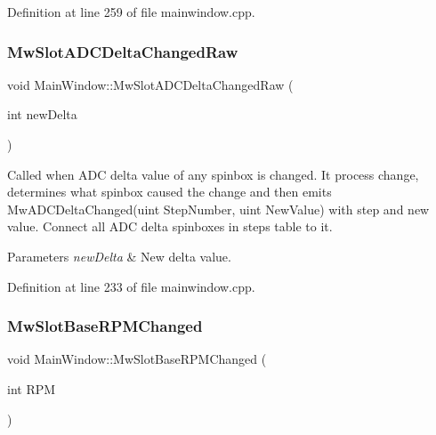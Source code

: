 Definition at line 259 of file mainwindow.\+cpp.

\mbox{\label{class_main_window_acbdfd3592779f6946c4fecc33c79e9a4}} 
\subsubsection{\texorpdfstring{Mw\+Slot\+A\+D\+C\+Delta\+Changed\+Raw}{MwSlotADCDeltaChangedRaw}}
{\footnotesize\ttfamily void Main\+Window\+::\+Mw\+Slot\+A\+D\+C\+Delta\+Changed\+Raw (\begin{DoxyParamCaption}\item[{int}]{new\+Delta }\end{DoxyParamCaption})\hspace{0.3cm}{\ttfamily [slot]}}



Called when A\+DC delta value of any spinbox is changed. It process change, determines what spinbox caused the change and then emits Mw\+A\+D\+C\+Delta\+Changed(uint Step\+Number, uint New\+Value) with step and new value. Connect all A\+DC delta spinboxes in steps table to it. 


\begin{DoxyParams}{Parameters}
{\em new\+Delta} & New delta value. \\
\hline
\end{DoxyParams}


Definition at line 233 of file mainwindow.\+cpp.

\mbox{\label{class_main_window_aaf5b44955c0c93824ea89edd3cdc5730}} 
\subsubsection{\texorpdfstring{Mw\+Slot\+Base\+R\+P\+M\+Changed}{MwSlotBaseRPMChanged}}
{\footnotesize\ttfamily void Main\+Window\+::\+Mw\+Slot\+Base\+R\+P\+M\+Changed (\begin{DoxyParamCaption}\item[{int}]{R\+PM }\end{DoxyParamCaption})\hspace{0.3cm}{\ttfamily [slot]}}



